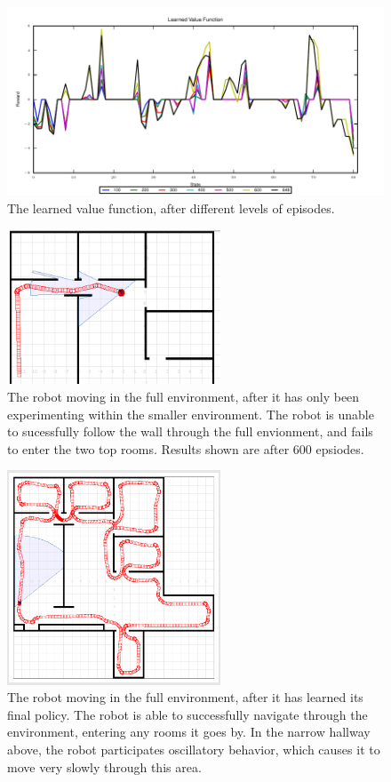 \documentclass[letterpaper, 10 pt, conference]{ieeeconf}  %
\begin{document}
\begin{figure}
\centering
\includegraphics[width=6in]{value-func.pdf}
\caption{The learned value function, after different levels of episodes.}
\label{fig:value-func}
\end{figure}

\begin{figure}
\centering
\includegraphics[width=2.5in]{stage-after-smallroom.png}
\caption{The robot moving in the full environment, after it has only been experimenting within the smaller environment.
The robot is unable to sucessfully follow the wall through the full envionment, and fails to enter the two top rooms. 
Results shown are after 600 epsiodes.}
\label{fig:smallroom}
\end{figure}

\begin{figure}
\centering
\includegraphics[width=2.5in]{stage-full-learned.png}
\caption{The robot moving in the full environment, after it has learned its final policy. 
The robot is able to successfully navigate through the environment, entering any rooms it goes by. 
In the narrow hallway above, the robot participates oscillatory behavior, which causes it to move very slowly through this area.}
\label{fig:full-learned}
\end{figure}
\end{document}
